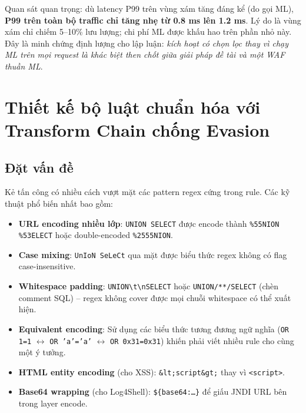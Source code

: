 \documentclass[../DoAn.tex]{subfiles}
\begin{document}
Quan sát quan trọng: dù latency P99 trên vùng xám tăng đáng kể (do gọi ML),
\textbf{P99 trên toàn bộ traffic chỉ tăng nhẹ từ 0.8 ms lên 1.2 ms}. Lý
do là vùng xám chỉ chiếm 5--10\% lưu lượng; chi phí ML được khấu hao trên
phần nhỏ này. Đây là minh chứng định lượng cho lập luận: \textit{kích hoạt
có chọn lọc thay vì chạy ML trên mọi request là khác biệt then chốt giữa
giải pháp đề tài và một WAF thuần ML}.

\section{Thiết kế bộ luật chuẩn hóa với Transform Chain chống Evasion}
\label{section:5.2}

\subsection{Đặt vấn đề}
\label{subsection:5.2.1}

Kẻ tấn công có nhiều cách vượt mặt các pattern regex cứng trong rule. Các
kỹ thuật phổ biến nhất bao gồm:

\begin{itemize}[leftmargin=*]
    \item \textbf{URL encoding nhiều lớp}: \texttt{UNION SELECT} được encode
    thành \texttt{\%55NION \%53ELECT} hoặc double-encoded \texttt{\%2555NION}.

    \item \textbf{Case mixing}: \texttt{UnIoN SeLeCt} qua mặt được biểu
    thức regex không có flag case-insensitive.

    \item \textbf{Whitespace padding}: \texttt{UNION\textbackslash t\textbackslash nSELECT}
    hoặc \texttt{UNION/**/SELECT} (chèn comment SQL) -- regex không cover
    được mọi chuỗi whitespace có thể xuất hiện.

    \item \textbf{Equivalent encoding}: Sử dụng các biểu thức tương đương
    ngữ nghĩa (\texttt{OR 1=1} \(\leftrightarrow\) \texttt{OR 'a'='a'}
    \(\leftrightarrow\) \texttt{OR 0x31=0x31}) khiến phải viết nhiều rule
    cho cùng một ý tưởng.

    \item \textbf{HTML entity encoding} (cho XSS): \texttt{\&lt;script\&gt;}
    thay vì \texttt{<script>}.

    \item \textbf{Base64 wrapping} (cho Log4Shell): \texttt{\$\{base64:\ldots\}}
    để giấu JNDI URL bên trong layer encode.
\end{itemize}
\end{document}
